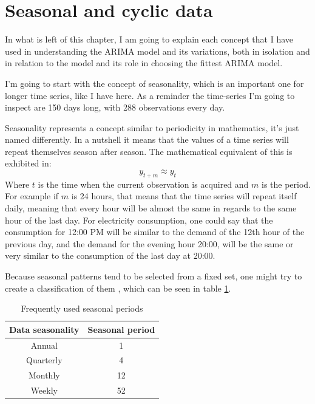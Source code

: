 \documentclass[12pt,a4paper,titlepage]{report}
\begin{document}

\section{Seasonal and cyclic data} \label{seasonaldatasection}
In what is left of this chapter, I am going to explain each concept that I have used in understanding the ARIMA model and its variations, both in isolation and in relation to the model and its role in choosing the fittest ARIMA model.

I'm going to start with the concept of seasonality, which is an important one for longer time series, like I have here. As a reminder the time-series I'm going to inspect are 150 days long, with 288 observations every day.

Seasonality represents a concept similar to periodicity in mathematics, it's just named differently. In a nutshell it means that the values of a time series will repeat themselves season after season. The mathematical equivalent of this is exhibited in:
\begin{equation}
    y_{t+m} \approx y_{t}
\end{equation}
Where $ t $ is the time when the current observation is acquired and $ m $ is the period. For example if $ m $ is 24 hours, that means that the time series will repeat itself daily, meaning that every hour will be almost the same in regards to the same hour of the last day. For electricity consumption, one could say that the consumption for 12:00 PM will be similar to the demand of the 12th hour of the previous day, and the demand for the evening hour 20:00, will be the same or very similar to the consumption of the last day at 20:00.

Because seasonal patterns tend to be selected from a fixed set, one might try to create a classification of them \cite{hyndmanseasonalperiods}, which can be seen in table \ref{frequentSeasonalPeriods}.

\begin{table}[h]
\begin{tabular}{|c|c|}
    \hline 
    \textbf{Data seasonality} & \textbf{Seasonal period} \\ \hline 
    Annual & 1 \\ \hline 
    Quarterly & 4 \\ \hline 
    Monthly & 12 \\ \hline 
    Weekly & 52 \\ \hline 
\end{tabular} 
\centering
\caption{Frequently used seasonal periods}
\label{frequentSeasonalPeriods}
\end{table}
\end{document}
